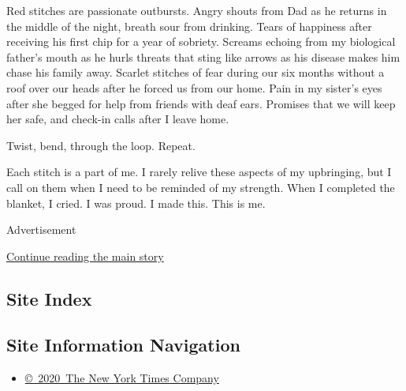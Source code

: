 Red stitches are passionate outbursts. Angry shouts from Dad as he
returns in the middle of the night, breath sour from drinking. Tears of
happiness after receiving his first chip for a year of sobriety. Screams
echoing from my biological father's mouth as he hurls threats that sting
like arrows as his disease makes him chase his family away. Scarlet
stitches of fear during our six months without a roof over our heads
after he forced us from our home. Pain in my sister's eyes after she
begged for help from friends with deaf ears. Promises that we will keep
her safe, and check-in calls after I leave home.

Twist, bend, through the loop. Repeat.

Each stitch is a part of me. I rarely relive these aspects of my
upbringing, but I call on them when I need to be reminded of my
strength. When I completed the blanket, I cried. I was proud. I made
this. This is me.

Advertisement

\protect\hyperlink{after-bottom}{Continue reading the main story}

\hypertarget{site-index}{%
\subsection{Site Index}\label{site-index}}

\hypertarget{site-information-navigation}{%
\subsection{Site Information
Navigation}\label{site-information-navigation}}

\begin{itemize}
\tightlist
\item
  \href{https://help.nytimes3xbfgragh.onion/hc/en-us/articles/115014792127-Copyright-notice}{©~2020~The
  New York Times Company}
\end{itemize}

